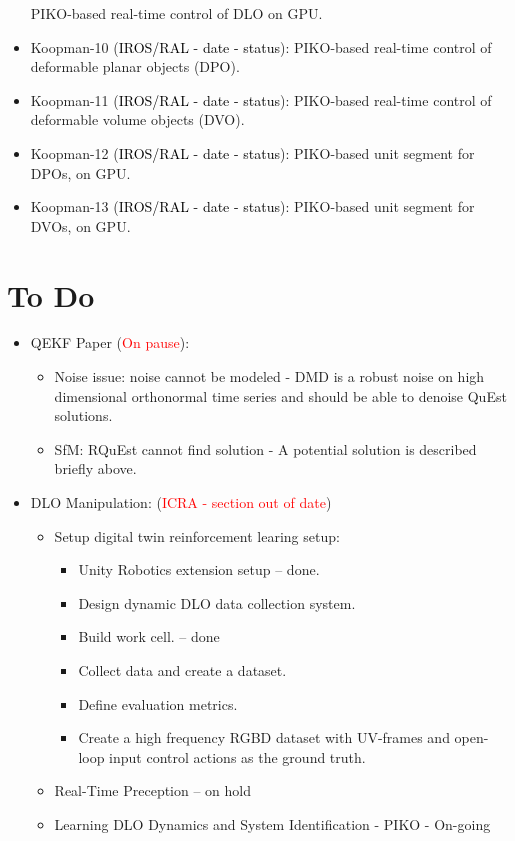 \documentclass[11pt]{article}
\begin{document}
\begin{itemize}
  PIKO-based real-time control of DLO on GPU.
  \item Koopman-10 (\textcolor{black}{IROS/RAL - date - status}):
  PIKO-based real-time control of deformable planar objects (DPO).
  \item Koopman-11 (\textcolor{black}{IROS/RAL - date - status}):
  PIKO-based real-time control of deformable volume objects (DVO).
  \item Koopman-12 (\textcolor{black}{IROS/RAL - date - status}):
  PIKO-based unit segment for DPOs, on GPU.
  \item Koopman-13 (\textcolor{black}{IROS/RAL - date - status}):
  PIKO-based unit segment for DVOs, on GPU.
\end{itemize}

\section{To Do}
\begin{itemize}
  \item QEKF Paper (\textcolor{red}{On pause}):
  \begin{itemize}
      \item Noise issue: noise cannot be modeled - DMD is a robust noise on high dimensional orthonormal time series and should be able to denoise QuEst solutions.
      \item SfM: RQuEst cannot find solution - A potential solution is described  briefly above.
  \end{itemize}
  \item  DLO Manipulation: (\textcolor{red}{ICRA - section out of date})
  \begin{itemize}
      \item Setup digital twin reinforcement learing setup:
      \begin{itemize}
        \item Unity Robotics extension setup -- done.
        \item Design dynamic DLO data collection system.
        \item Build work cell. -- done
        \item Collect data and create a dataset.
        \item Define evaluation metrics.
        \item Create a high frequency RGBD dataset with UV-frames and open-loop input control actions as the ground truth.
      \end{itemize}
      \item Real-Time Preception -- on hold
      \item Learning DLO Dynamics and System Identification - PIKO - On-going
  \end{itemize}
\end{itemize}
\end{document}
